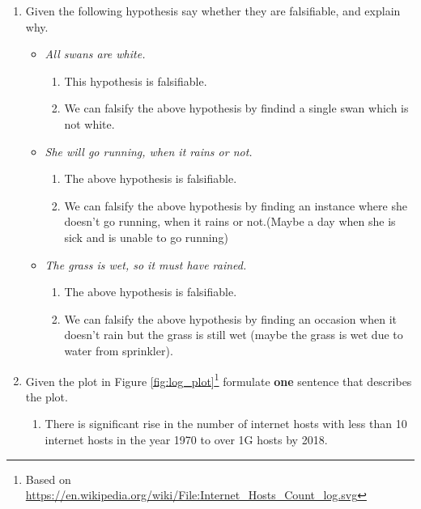 \documentclass{resources/WeSTassignment}
\begin{document}
\begin{enumerate}
    \item Given the following hypothesis say whether they are falsifiable, and explain why.
        \begin{itemize}
            \item \emph{All swans are white.}
            \begin{enumerate}
            \item This hypothesis is falsifiable.
            \item We can falsify the above hypothesis by findind a single swan which is not white.
            \end{enumerate}
            \item \emph{She will go running, when it rains or not.}
            \begin{enumerate}
            \item The above hypothesis is falsifiable.
            \item We can falsify the above hypothesis by finding an instance where she doesn't go running, when it rains or not.(Maybe a day when she is sick and is unable to go running)
            \end{enumerate}
            \item \emph{The grass is wet, so it must have rained.}
            \begin{enumerate}
            \item The above hypothesis is falsifiable.
            \item We can falsify the above hypothesis by finding an occasion when it doesn't rain but the grass is still wet (maybe the grass is wet due to water from sprinkler).
            \end{enumerate}
        \end{itemize}
    \item Given the plot in Figure \ref{fig:log_plot}\footnote{Based on       \url{https://en.wikipedia.org/wiki/File:Internet\_Hosts\_Count\_log.svg} }  formulate \textbf{one} sentence that describes the plot.
    \begin{enumerate}
    	\item There is significant rise in the number of internet hosts with less than 10 internet hosts in the year 1970 to over 1G hosts by 2018.
    \end{enumerate}
\end{enumerate}
\end{document}
